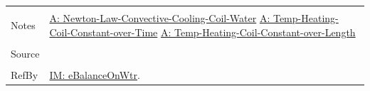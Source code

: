 \documentclass[12pt]{article}
\begin{document}
\begin{minipage}{\textwidth}
\begin{tabular}{p{} p{}}
                                                  \\ \midrule \\
                                                  Notes & \hyperref[A:Newton-Law-Convective-Cooling-Coil-Water]{A: Newton-Law-Convective-Cooling-Coil-Water}
                                                          \hyperref[A:Temp-Heating-Coil-Constant-over-Time]{A: Temp-Heating-Coil-Constant-over-Time}
                                                          \hyperref[A:Temp-Heating-Coil-Constant-over-Length]{A: Temp-Heating-Coil-Constant-over-Length}
                                                          \\ \midrule \\
                                                          Source & \cite{koothoor2013}
                                                                   \\ \midrule \\
                                                                   RefBy & \hyperref[IM:eBalanceOnWtr]{IM: eBalanceOnWtr}.
\\ \bottomrule \end{tabular}
\end{minipage}\\
~\newline
\end{document}
